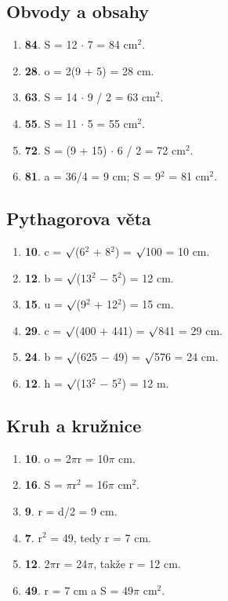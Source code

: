 \documentclass[11pt,a4paper]{article}
\begin{document}
\subsection*{Obvody a obsahy}
\begin{enumerate}[label=\arabic*.,start=7,leftmargin=*,itemsep=3pt]
\item \textbf{84}. S = 12 $\cdot$ 7 = 84 cm$^2$.
\item \textbf{28}. o = 2(9 + 5) = 28 cm.
\item \textbf{63}. S = 14 $\cdot$ 9 / 2 = 63 cm$^2$.
\item \textbf{55}. S = 11 $\cdot$ 5 = 55 cm$^2$.
\item \textbf{72}. S = (9 + 15) $\cdot$ 6 / 2 = 72 cm$^2$.
\item \textbf{81}. a = 36/4 = 9 cm; S = 9$^2$ = 81 cm$^2$.
\end{enumerate}
\subsection*{Pythagorova věta}
\begin{enumerate}[label=\arabic*.,start=13,leftmargin=*,itemsep=3pt]
\item \textbf{10}. c = \ensuremath{\surd}(6$^2$ + 8$^2$) = \ensuremath{\surd}100 = 10 cm.
\item \textbf{12}. b = \ensuremath{\surd}(13$^2$ $-$ 5$^2$) = 12 cm.
\item \textbf{15}. u = \ensuremath{\surd}(9$^2$ + 12$^2$) = 15 cm.
\item \textbf{29}. c = \ensuremath{\surd}(400 + 441) = \ensuremath{\surd}841 = 29 cm.
\item \textbf{24}. b = \ensuremath{\surd}(625 $-$ 49) = \ensuremath{\surd}576 = 24 cm.
\item \textbf{12}. h = \ensuremath{\surd}(13$^2$ $-$ 5$^2$) = 12 m.
\end{enumerate}
\subsection*{Kruh a kružnice}
\begin{enumerate}[label=\arabic*.,start=19,leftmargin=*,itemsep=3pt]
\item \textbf{10}. o = 2$\pi$r = 10$\pi$ cm.
\item \textbf{16}. S = $\pi$r$^2$ = 16$\pi$ cm$^2$.
\item \textbf{9}. r = d/2 = 9 cm.
\item \textbf{7}. r$^2$ = 49, tedy r = 7 cm.
\item \textbf{12}. 2$\pi$r = 24$\pi$, takže r = 12 cm.
\item \textbf{49}. r = 7 cm a S = 49$\pi$ cm$^2$.
\end{enumerate}
\end{document}
